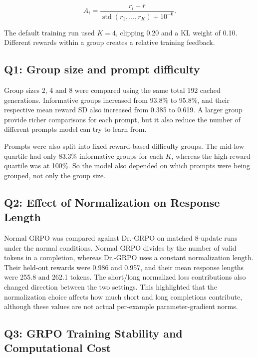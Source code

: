 \documentclass{article}
\begin{document}
\begin{equation}
A_i=\frac{r_i-\overline{r}}{\operatorname{std}(r_1,\ldots,r_K)+10^{-6}}.
\end{equation}

The default training run used $K=4$, clipping 0.20 and a KL weight of 0.10. Different rewards within a group creates a relative training feedback.

\subsection{Q1: Group size and prompt difficulty}


Group sizes 2, 4 and 8 were compared using the same total 192 cached generations. Informative groups increased from 93.8\% to 95.8\%, and their respective mean reward SD also increased from 0.385 to 0.619. A larger group provide richer comparisons for each prompt, but it also reduce the number of different prompts model can try to learn from. 



Prompts were also split into fixed reward-based difficulty groups. The mid-low quartile had only 83.3\% informative groups for each $K$, whereas the high-reward quartile was at 100\%. So the model also depended on which prompts were being grouped, not only the group size.

\subsection{Q2: Effect of Normalization on Response Length}


Normal GRPO was compared against Dr.-GRPO on matched 8-update runs under the normal conditions. Normal GRPO divides by the number of valid tokens in a completion, whereas Dr.-GRPO uses a constant normalization length. Their held-out rewards were 0.986 and 0.957, and their mean response lengths were 255.8 and 262.1 tokens. The short/long normalized loss contributions also changed direction between the two settings. This highlighted that the normalization choice affects how much short and long completions contribute, although these values are not actual per-example parameter-gradient norms.
\subsection{Q3: GRPO Training Stability and Computational Cost}
\end{document}

